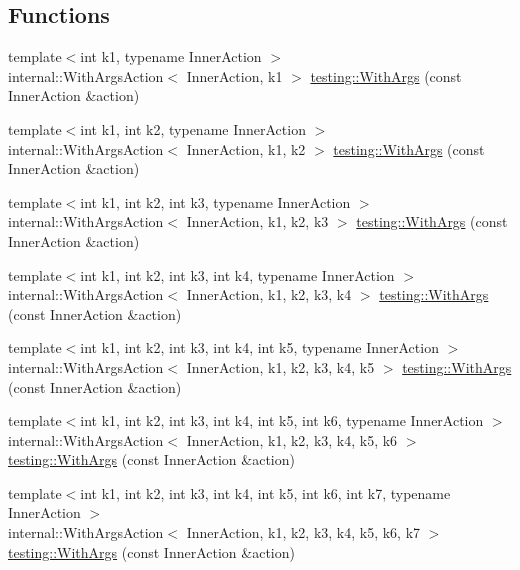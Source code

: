 \subsection*{Functions}
\begin{DoxyCompactItemize}
\item 
{\footnotesize template$<$int k1, typename Inner\+Action $>$ }\\internal\+::\+With\+Args\+Action$<$ Inner\+Action, k1 $>$ \hyperlink{namespacetesting_a3bd9eef13bee9065b19d3cd571829c7c}{testing\+::\+With\+Args} (const Inner\+Action \&action)
\item 
{\footnotesize template$<$int k1, int k2, typename Inner\+Action $>$ }\\internal\+::\+With\+Args\+Action$<$ Inner\+Action, k1, k2 $>$ \hyperlink{namespacetesting_aa82fc09250ba172220e6fb7e77249e74}{testing\+::\+With\+Args} (const Inner\+Action \&action)
\item 
{\footnotesize template$<$int k1, int k2, int k3, typename Inner\+Action $>$ }\\internal\+::\+With\+Args\+Action$<$ Inner\+Action, k1, k2, k3 $>$ \hyperlink{namespacetesting_a999614cb785165b9a44a9a95a3753407}{testing\+::\+With\+Args} (const Inner\+Action \&action)
\item 
{\footnotesize template$<$int k1, int k2, int k3, int k4, typename Inner\+Action $>$ }\\internal\+::\+With\+Args\+Action$<$ Inner\+Action, k1, k2, k3, k4 $>$ \hyperlink{namespacetesting_a646a2e4ac7866ee8c486cb167ba9b45e}{testing\+::\+With\+Args} (const Inner\+Action \&action)
\item 
{\footnotesize template$<$int k1, int k2, int k3, int k4, int k5, typename Inner\+Action $>$ }\\internal\+::\+With\+Args\+Action$<$ Inner\+Action, k1, k2, k3, k4, k5 $>$ \hyperlink{namespacetesting_aa36b0c7216df96bdacf9fe491afd40bd}{testing\+::\+With\+Args} (const Inner\+Action \&action)
\item 
{\footnotesize template$<$int k1, int k2, int k3, int k4, int k5, int k6, typename Inner\+Action $>$ }\\internal\+::\+With\+Args\+Action$<$ Inner\+Action, k1, k2, k3, k4, k5, k6 $>$ \hyperlink{namespacetesting_a6df9cd27659e5943b5d3d77fc4f102e3}{testing\+::\+With\+Args} (const Inner\+Action \&action)
\item 
{\footnotesize template$<$int k1, int k2, int k3, int k4, int k5, int k6, int k7, typename Inner\+Action $>$ }\\internal\+::\+With\+Args\+Action$<$ Inner\+Action, k1, k2, k3, k4, k5, k6, k7 $>$ \hyperlink{namespacetesting_a04146a27847141c6942e9c67a85aadbe}{testing\+::\+With\+Args} (const Inner\+Action \&action)

\end{DoxyCompactItemize}
